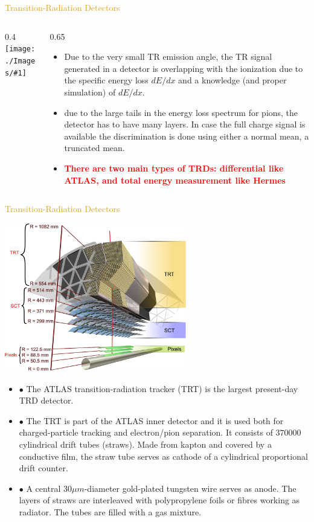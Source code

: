 \documentclass[11pt]{beamer} %
\renewcommand{\(}{\begin{columns}}
\renewcommand{\)}{\end{columns}}
\newcommand{\<}[1]{\begin{column}{#1}}
\renewcommand{\>}{\end{column}}
\newcommand{\itt}{\begin{itemize}}
\newcommand{\tti}{\end{itemize}}
\newcommand{\img}[1]{\texttt{[image: ./Images/\#1]}}
\newcommand{\hlt}[2]{\textcolor{#1}{\textbf{#2}}}
\begin{document}
\begin{frame}{\textcolor{Goldenrod}{Transition-Radiation Detectors}}
  \(
  \<{0.4\textwidth}
  \img{TRD_12}
  \>
  \<{0.65\textwidth}
  \itt
\item Due to the very small TR emission angle, the TR signal generated in a
  detector is overlapping with the ionization due to the specific energy
  loss $dE/dx$ and a knowledge (and proper simulation) of $dE/dx$.
\item due to the large tails in the energy loss spectrum for pions,
  the detector has to have many layers. In case the full charge signal
  is available the discrimination is done using either a normal mean,
  a truncated mean.
\item \hlt{Red}{There are two main types of TRDs: differential like ATLAS, and
  total energy measurement like Hermes}
  \tti
  \> 
  \)  
\end{frame}

\begin{frame}{\textcolor{Goldenrod}{Transition-Radiation Detectors}}
  \begin{center}
    \includegraphics[width=0.6\textwidth, height=0.4\textheight]{./Images/TRD_01}
  \end{center}
\scriptsize
  \itt
\item[$\bullet$] \alert{The ATLAS transition-radiation tracker (TRT) is the
  largest present-day TRD detector.}
\item[$\bullet$] The TRT is part of the ATLAS inner detector and it
  is used both for charged-particle tracking and electron/pion
  separation. It consists of $370 000$ cylindrical drift tubes (straws).
  Made from kapton and covered by a conductive film, the straw tube
  serves as cathode of a cylindrical proportional drift counter.
\item[$\bullet$] A central $30 \mu m$-diameter gold-plated tungsten
  wire serves as anode. The layers of straws are interleaved with
  polypropylene foils or fibres working as radiator. The tubes are
  filled with a gas mixture.
  \tti
\end{frame}  
\end{document}
